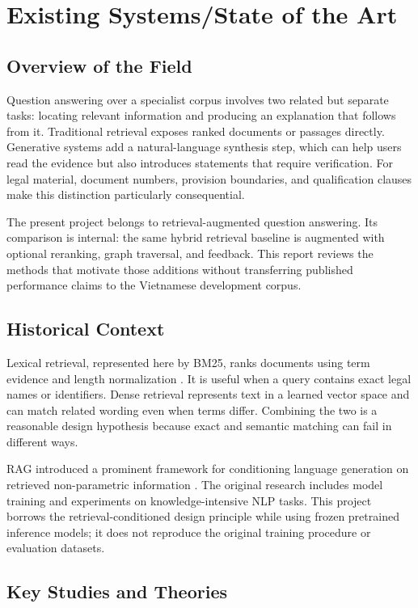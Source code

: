 \documentclass[11pt,a4paper,oneside]{report}
\begin{document}
\chapter{Existing Systems/State of the Art}
\section{Overview of the Field}
Question answering over a specialist corpus involves two related but separate tasks: locating relevant information and producing an explanation that follows from it. Traditional retrieval exposes ranked documents or passages directly. Generative systems add a natural-language synthesis step, which can help users read the evidence but also introduces statements that require verification. For legal material, document numbers, provision boundaries, and qualification clauses make this distinction particularly consequential.

The present project belongs to retrieval-augmented question answering. Its comparison is internal: the same hybrid retrieval baseline is augmented with optional reranking, graph traversal, and feedback. This report reviews the methods that motivate those additions without transferring published performance claims to the Vietnamese development corpus.

\section{Historical Context}
Lexical retrieval, represented here by BM25, ranks documents using term evidence and length normalization \citep{robertson2009bm25}. It is useful when a query contains exact legal names or identifiers. Dense retrieval represents text in a learned vector space and can match related wording even when terms differ. Combining the two is a reasonable design hypothesis because exact and semantic matching can fail in different ways.

RAG introduced a prominent framework for conditioning language generation on retrieved non-parametric information \citep{lewis2020rag}. The original research includes model training and experiments on knowledge-intensive NLP tasks. This project borrows the retrieval-conditioned design principle while using frozen pretrained inference models; it does not reproduce the original training procedure or evaluation datasets.

\section{Key Studies and Theories}
\end{document}
